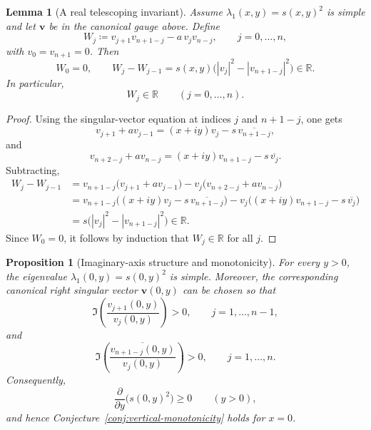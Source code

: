 \documentclass[11pt]{article}
\newtheorem{lemma}[theorem]{Lemma}
\newtheorem{proposition}[theorem]{Proposition}
\begin{document}
\begin{lemma}[A real telescoping invariant]\label{lem:W-real}
Assume \(\lambda_1(x,y)=s(x,y)^2\) is simple and let \(\mathbf v\) be in the canonical gauge above. Define
\[
W_j\coloneqq v_{j+1}v_{n+1-j}-a\,v_jv_{n-j},
\qquad
j=0,\dots,n,
\]
with \(v_0=v_{n+1}=0\). Then
\[
W_0=0,
\qquad
W_j-W_{j-1}=s(x,y)\bigl(|v_j|^2-|v_{n+1-j}|^2\bigr)\in\mathbb R.
\]
In particular,
\[
W_j\in\mathbb R
\qquad
(j=0,\dots,n).
\]
\end{lemma}

\begin{proof}
Using the singular-vector equation at indices \(j\) and \(n+1-j\), one gets
\[
v_{j+1}+a v_{j-1}=(x+iy)v_j-s\,\overline{v_{n+1-j}},
\]
and
\[
v_{n+2-j}+a v_{n-j}=(x+iy)v_{n+1-j}-s\,\overline{v_j}.
\]
Subtracting,
\begin{align*}
W_j-W_{j-1}
&=
v_{n+1-j}\bigl(v_{j+1}+a v_{j-1}\bigr)
-
v_j\bigl(v_{n+2-j}+a v_{n-j}\bigr) \\
&=
v_{n+1-j}\bigl((x+iy)v_j-s\,\overline{v_{n+1-j}}\bigr)
-
v_j\bigl((x+iy)v_{n+1-j}-s\,\overline{v_j}\bigr) \\
&=
s\bigl(|v_j|^2-|v_{n+1-j}|^2\bigr)\in\mathbb R.
\end{align*}
Since \(W_0=0\), it follows by induction that \(W_j\in\mathbb R\) for all \(j\).
\end{proof}

\begin{proposition}[Imaginary-axis structure and monotonicity]\label{prop:x=0-monotonicity}
For every \(y>0\), the eigenvalue \(\lambda_1(0,y)=s(0,y)^2\) is simple. Moreover, the corresponding canonical right singular vector \(\mathbf v(0,y)\) can be chosen so that
\[
\Im\!\left(\frac{v_{j+1}(0,y)}{v_j(0,y)}\right)>0,
\qquad
j=1,\dots,n-1,
\]
and
\[
\Im\!\left(\frac{\overline{v_{n+1-j}(0,y)}}{v_j(0,y)}\right)>0,
\qquad
j=1,\dots,n.
\]
Consequently,
\[
\frac{\partial}{\partial y}\bigl(s(0,y)^2\bigr)\ge 0
\qquad (y>0),
\]
and hence Conjecture~\ref{conj:vertical-monotonicity} holds for \(x=0\).
\end{proposition}
\end{document}
